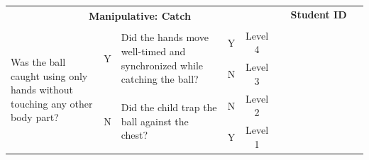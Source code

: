 \documentclass[
  letterpaper,
  DIV=11,
  numbers=noendperiod]{scrartcl}
\begin{document}
\begin{tabular}{|p{5.5cm}|c|p{5.5cm}|c|c|*{9}{p{1.07cm}|}}
\hline
\multicolumn{5}{|c|}{\multirow{2}{*}{\centering \textbf{Manipulative: Catch}}} & \multicolumn{9}{c|}{\textbf{Student ID}} \\ 
\cline{6-14}
\multicolumn{5}{|c|}{} & & & & & & & & & \\
\hline
\multirow{4}{5.5cm}{\raggedright {\footnotesize Was the ball caught using only hands without touching any other body part?}} 
& \multirow{2}{*}{\footnotesize Y} 
& \multirow{2}{5.5cm}{\raggedright {\footnotesize Did the hands move well-timed and synchronized while catching the ball?}} & {\footnotesize Y} & {\footnotesize Level 4} & & & & & & & & & \\
\cline{4-14}
& & & {\footnotesize N} & {\footnotesize Level 3} & & & & & & & & & \\
\cline{2-14}
& \multirow{2}{*}{\footnotesize N} & \multirow{2}{5.5cm}{\raggedright {\footnotesize Did the child trap the ball against the chest?}} & {\footnotesize N} & {\footnotesize Level 2} & & & & & & & & & \\
\cline{4-14}
& & & {\footnotesize Y} & {\footnotesize Level 1} & & & & & & & & & \\
\hline
\end{tabular}

\vspace{.5em}
\end{document}
